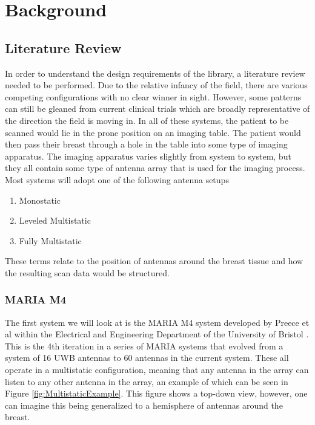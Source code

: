 \chapter*{Background}
\section{Literature Review}
In order to understand the design requirements of the library, a literature review needed to be performed. Due to the
relative infancy of the field, there are various competing configurations with no clear winner in sight. However, some
patterns can still be gleaned from current clinical trials which are broadly representative of the direction the field
is moving in. In all of these systems, the patient to be scanned would lie in the prone position on an imaging table.
The patient would then pass their breast through a hole in the table into some type of imaging apparatus. The imaging
apparatus varies slightly from system to system, but they all contain some type of antenna array that is used for the
imaging process. Most systems will adopt one of the following antenna setups
\begin{enumerate}
    \item Monostatic
    \item Leveled Multistatic
    \item Fully Multistatic
\end{enumerate}
\noindent These terms relate to the position of antennas around the breast tissue and how the resulting scan data would
be structured. \hfill \break

\subsection{MARIA M4}
The first system we will look at is the MARIA M4 system developed by Preece et al within the Electrical and Engineering
Department of the University of Bristol \cite{preeceMARIAM4Clinical2016}. This is the 4th iteration in a series of MARIA systems that evolved from a
system of 16 UWB antennas to 60 antennas in the current system. These all operate in a multistatic configuration,
meaning that any antenna in the array can listen to any other antenna in the array, an example of which can be seen in
Figure \ref{fig:MultistaticExample}. This figure shows a top-down view, however, one can imagine this being generalized
to a hemisphere of antennas around the breast. \hfill

